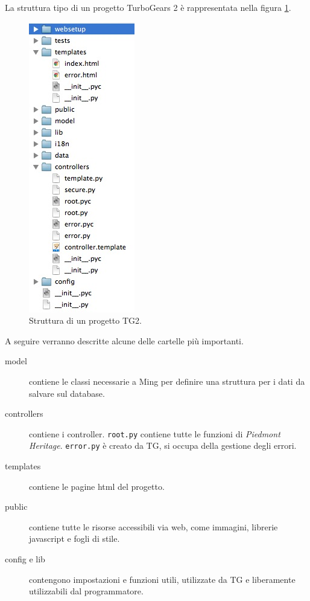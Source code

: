 La struttura tipo di un progetto TurboGears 2 è rappresentata nella figura \ref{fig:progetto}.
\begin{figure}[ht!]
	\caption{Struttura di un progetto TG2.}
	\label{fig:progetto}
	\centering
	\includegraphics{img/tg2project.jpg}
\end{figure}

A seguire verranno descritte alcune delle cartelle più importanti.
\begin{description}
\item[model] contiene le classi necessarie a Ming per definire una struttura per i dati da salvare sul database.
\item[controllers] contiene i controller. \texttt{root.py} contiene tutte le funzioni di \emph{Piedmont Heritage}. \texttt{error.py} è creato da TG, si occupa della gestione degli errori.
\item[templates] contiene le pagine html del progetto.
\item[public] contiene tutte le risorse accessibili via web, come immagini, librerie javascript e fogli di stile.
\item[config e lib] contengono impostazioni e funzioni utili, utilizzate da TG e liberamente utilizzabili dal programmatore.
\end{description}

